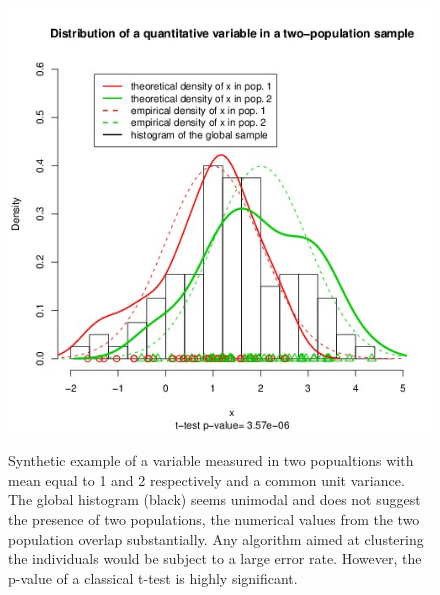 \documentclass{article}
\begin{document}
\begin{figure}[h]
\includegraphics[height=12cm,width=17cm]{../inst/images/power.jpeg}
\caption{Synthetic example of a variable measured in two popualtions with mean equal to 1 and 2 respectively and a common unit variance. 
The global histogram (black) seems unimodal and does not suggest the presence of two populations, the numerical values 
from the two population overlap substantially. Any algorithm aimed at clustering the individuals 
would be subject to a large error rate. However, the p-value of a classical t-test is highly significant.}\label{fig:power}
\end{figure}
\end{document}
